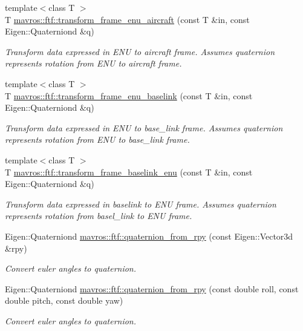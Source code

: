 \begin{DoxyCompactItemize}
{\footnotesize template$<$class T $>$ }\\T \mbox{\hyperlink{group__nodelib_ga669df732714ea8b69f228efba9f05dbb}{mavros\+::ftf\+::transform\+\_\+frame\+\_\+enu\+\_\+aircraft}} (const T \&in, const Eigen\+::\+Quaterniond \&q)
\begin{DoxyCompactList}\small\item\em Transform data expressed in E\+NU to aircraft frame. Assumes quaternion represents rotation from E\+NU to aircraft frame. \end{DoxyCompactList}\item 
{\footnotesize template$<$class T $>$ }\\T \mbox{\hyperlink{group__nodelib_ga2f2546cf431334a76e19fdd3800f286d}{mavros\+::ftf\+::transform\+\_\+frame\+\_\+enu\+\_\+baselink}} (const T \&in, const Eigen\+::\+Quaterniond \&q)
\begin{DoxyCompactList}\small\item\em Transform data expressed in E\+NU to base\+\_\+link frame. Assumes quaternion represents rotation from E\+NU to base\+\_\+link frame. \end{DoxyCompactList}\item 
{\footnotesize template$<$class T $>$ }\\T \mbox{\hyperlink{group__nodelib_ga59326acc337daa1ce44d56ee6acff76b}{mavros\+::ftf\+::transform\+\_\+frame\+\_\+baselink\+\_\+enu}} (const T \&in, const Eigen\+::\+Quaterniond \&q)
\begin{DoxyCompactList}\small\item\em Transform data expressed in baselink to E\+NU frame. Assumes quaternion represents rotation from basel\+\_\+link to E\+NU frame. \end{DoxyCompactList}\item 
Eigen\+::\+Quaterniond \mbox{\hyperlink{group__nodelib_ga1f1d174745db801a82766fa0839b17e1}{mavros\+::ftf\+::quaternion\+\_\+from\+\_\+rpy}} (const Eigen\+::\+Vector3d \&rpy)
\begin{DoxyCompactList}\small\item\em Convert euler angles to quaternion. \end{DoxyCompactList}\item 
Eigen\+::\+Quaterniond \mbox{\hyperlink{group__nodelib_ga97ccf75c02bae67e6fa6fd98b804d735}{mavros\+::ftf\+::quaternion\+\_\+from\+\_\+rpy}} (const double roll, const double pitch, const double yaw)
\begin{DoxyCompactList}\small\item\em Convert euler angles to quaternion. \end{DoxyCompactList}\item 

\end{DoxyCompactItemize}
